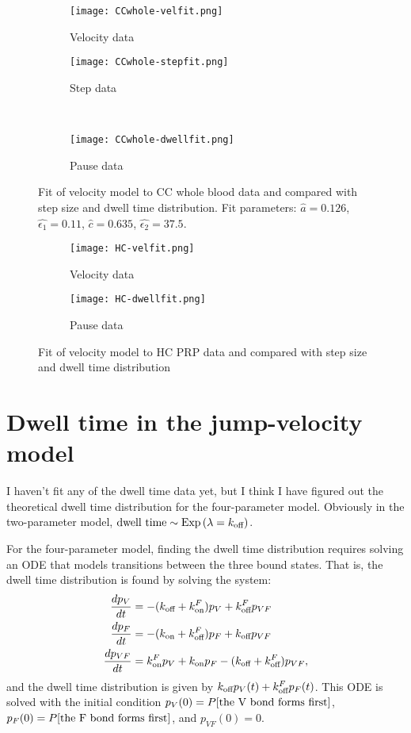 \documentclass{article}
\newcommand{\tn}{\textnormal}
\newcommand{\dd}{d}
\newcommand{\Der}[2]{\frac{\dd #1}{\dd #2}}
\DeclareMathOperator{\Exp}{Exp}
\begin{document}
\begin{figure}
  \centering
  \begin{subfigure}{0.48\textwidth}
    \texttt{[image: CCwhole-velfit.png]}
    \caption{Velocity data}
  \end{subfigure}
  \hfill
  \begin{subfigure}{0.48\textwidth}
    \texttt{[image: CCwhole-stepfit.png]}
    \caption{Step data}
  \end{subfigure}
  \\
  \begin{subfigure}{0.48\textwidth}
    \texttt{[image: CCwhole-dwellfit.png]}
    \caption{Pause data}
  \end{subfigure}
  \caption{Fit of velocity model to CC whole blood data and compared
    with step size and dwell time distribution. Fit parameters:
    $\hat{a} = 0.126$, $\hat{\epsilon_1} = 0.11$, $\hat{c} = 0.635$,
    $\hat{\epsilon_2} = 37.5$.}
  \label{fig:ccwhole-velfit}
\end{figure}

\begin{figure}
  \centering
  \begin{subfigure}{0.48\textwidth}
    \texttt{[image: HC-velfit.png]}
    \caption{Velocity data}
  \end{subfigure}
  \hfill
  \begin{subfigure}{0.48\textwidth}
    \texttt{[image: HC-dwellfit.png]}
    \caption{Pause data}
  \end{subfigure}
  \caption{Fit of velocity model to HC PRP data and compared
    with step size and dwell time distribution}
  \label{fig:hc-velfit}
\end{figure}

\section{Dwell time in the jump-velocity model}
\label{sec:dwell-time-jump}

I haven't fit any of the dwell time data yet, but I think I have
figured out the theoretical dwell time distribution for the
four-parameter model. Obviously in the two-parameter model, $\tn{dwell
  time} \sim \Exp\left(\lambda = k_\tn{off}\right)$.

For the four-parameter model, finding the dwell time distribution
requires solving an ODE that models transitions between the three
bound states. That is, the dwell time distribution is found by solving
the system:
\begin{align}
  \Der{p_V}{t} &= -(k_\tn{off} + k_\tn{on}^F)p_V + k_\tn{off}^F p_{VF}
  \\
  \Der{p_F}{t} &= -(k_\tn{on} + k_\tn{off}^F)p_F + k_\tn{off} p_{VF}
  \\
  \Der{p_{VF}}{t} &= k_\tn{on}^F p_V + k_\tn{on} p_F - (k_\tn{off} +
                    k_\tn{off}^F) p_{VF},
\end{align}
and the dwell time distribution is given by
$k_\tn{off} p_V(t) + k_\tn{off}^F p_F(t)$. This ODE is solved with the
initial condition $p_V(0) = P[\tn{the V bond forms first}]$,
$p_F(0) = P[\tn{the F bond forms first}]$, and $p_{VF}(0) = 0$.

% 
% 
\end{document}
